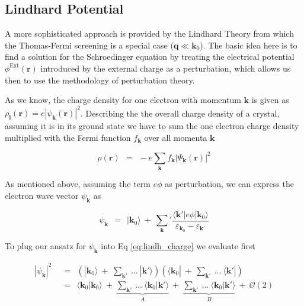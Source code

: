 \documentclass[10pt]{report}
\numberwithin{equation}{chapter}
\newcommand{\refEq}[1]{
  Eq  \ref{#1}
}
\newcommand{\OO}{ %
  \mathcal{O}
}
\begin{document}
\subsection{Lindhard Potential}

A more sophisticated approach is provided by the Lindhard Theory from which the Thomas-Fermi screening is a special case ($\mathbf{q} \ll \mathbf{k}_0$). The basic idea here is to find a solution for the Schroedinger equation by treating the electrical potential $\phi^\text{Ext}(\mathbf{r})$ introduced by the external charge as a perturbation, which allows us then to use the methodology of perturbation theory.

As we know, the charge density for one electron with momentum $\mathbf{k}$ is given as $\rho_\mathbf{l}(\mathbf{r}) = e|\psi_\mathbf{k}(\mathbf{r})|^2$. Describing the the overall charge density of a crystal, assuming it is in its ground state we have to sum the one electron charge density multiplied with the Fermi function $f_\mathbf{k}$ over all momenta $\mathbf{k}$

\begin{equation} \label{eq:lindh_charge}
  \rho(\mathbf{r}) ~~=~~ -e \sum_\mathbf{k} f_\mathbf{k} | \Psi_\mathbf{k}(\mathbf{r}) |^2
\end{equation}


As mentioned above, assuming the term $e\phi$ as perturbation, we can express the electron wave vector $\psi_\mathbf{k}$ as 

\begin{equation} \label{eq:lindh_wf}
  \psi_\mathbf{k} ~~=~~ | \mathbf{k}_0 \rangle ~+~ \sum_\mathbf{k}' \frac{\langle \mathbf{k}' | e\phi | \mathbf{k}_0 \rangle}{\varepsilon_{\mathbf{k}_0} - \varepsilon_{\mathbf{k}'}}
\end{equation}


To plug our ansatz for $\psi_\mathbf{k}$ into \refEq{eq:lindh_charge} we evaluate first

\begin{align} \label{eq:lindh_wf_squared}
  | \psi_\mathbf{k} |^2 ~~& =~~ \left( |\mathbf{k}_0 \rangle ~+~ \sum_{\mathbf{k}'}\ ...\ |\mathbf{k}' \rangle \right) \left( \langle \mathbf{k}_0 | ~+~ \sum_{\mathbf{k}'}\ ...\ \langle \mathbf{k}' | \right) \nonumber \\
  ~~& =~~ \langle \mathbf{k}_0 | \mathbf{k}_0 \rangle ~+~ 
  \underbrace{\sum_{\mathbf{k}'}\ ...\ \langle \mathbf{k}_0 | \mathbf{k}' \rangle}_{A} ~+~ 
  \underbrace{\sum_{\mathbf{k}'}\ ...\ \langle \mathbf{k}_0 | \mathbf{k}' \rangle}_{B} ~+~ \OO(2)
\end{align}
\end{document}
